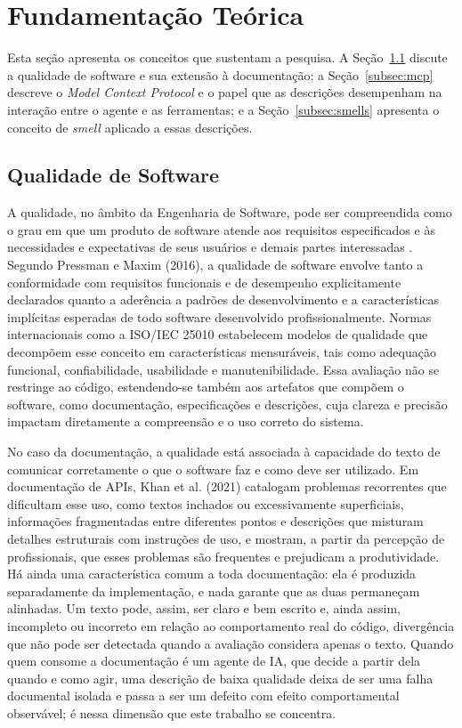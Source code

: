 \section{Fundamentação Teórica}
\label{sec:fundamentacao}

Esta seção apresenta os conceitos que sustentam a pesquisa. A Seção~\ref{subsec:qualidade} discute a qualidade de software e sua extensão à documentação; a Seção~\ref{subsec:mcp} descreve o \textit{Model Context Protocol} e o papel que as descrições desempenham na interação entre o agente e as ferramentas; e a Seção~\ref{subsec:smells} apresenta o conceito de \textit{smell} aplicado a essas descrições.

\subsection{Qualidade de Software}
\label{subsec:qualidade}

A qualidade, no âmbito da Engenharia de Software, pode ser compreendida como o grau em que um produto de software atende aos requisitos especificados e às necessidades e expectativas de seus usuários e demais partes interessadas \cite{iso24765}. Segundo Pressman e Maxim (2016)\nocite{pressman2016}, a qualidade de software envolve tanto a conformidade com requisitos funcionais e de desempenho explicitamente declarados quanto a aderência a padrões de desenvolvimento e a características implícitas esperadas de todo software desenvolvido profissionalmente. Normas internacionais como a ISO/IEC 25010 \cite{iso25010} estabelecem modelos de qualidade que decompõem esse conceito em características mensuráveis, tais como adequação funcional, confiabilidade, usabilidade e manutenibilidade. Essa avaliação não se restringe ao código, estendendo-se também aos artefatos que compõem o software, como documentação, especificações e descrições, cuja clareza e precisão impactam diretamente a compreensão e o uso correto do sistema.

No caso da documentação, a qualidade está associada à capacidade do texto de comunicar corretamente o que o software faz e como deve ser utilizado. Em documentação de APIs, Khan et al. (2021)\nocite{khan2021} catalogam problemas recorrentes que dificultam esse uso, como textos inchados ou excessivamente superficiais, informações fragmentadas entre diferentes pontos e descrições que misturam detalhes estruturais com instruções de uso, e mostram, a partir da percepção de profissionais, que esses problemas são frequentes e prejudicam a produtividade. Há ainda uma característica comum a toda documentação: ela é produzida separadamente da implementação, e nada garante que as duas permaneçam alinhadas. Um texto pode, assim, ser claro e bem escrito e, ainda assim, incompleto ou incorreto em relação ao comportamento real do código, divergência que não pode ser detectada quando a avaliação considera apenas o texto. Quando quem consome a documentação é um agente de IA, que decide a partir dela quando e como agir, uma descrição de baixa qualidade deixa de ser uma falha documental isolada e passa a ser um defeito com efeito comportamental observável; é nessa dimensão que este trabalho se concentra.

